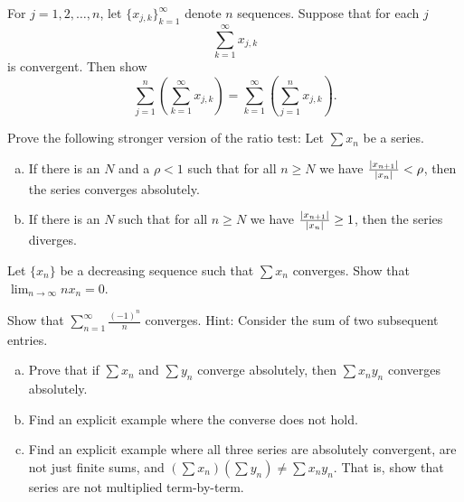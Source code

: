 \begin{exercise}
For $j=1,2,\ldots,n$, let $\{ x_{j,k} \}_{k=1}^\infty$ denote $n$
sequences.  Suppose that for each $j$
\begin{equation*}
\sum_{k=1}^\infty x_{j,k}
\end{equation*}
is convergent.  Then show
\begin{equation*}
\sum_{j=1}^n \left( \sum_{k=1}^\infty x_{j,k} \right)
=
\sum_{k=1}^\infty \left( \sum_{j=1}^n x_{j,k} \right) .
\end{equation*}
\end{exercise}

\begin{exercise}
Prove the following stronger version of the ratio test:
Let $\sum x_n$ be a series.
\begin{enumerate}[a)]
\item
If there is an $N$ and a $\rho < 1$ such that for
all $n \geq N$ we have
$\frac{\left\lvert {x_{n+1}} \right\rvert}{\left\lvert {x_n} \right\rvert} < \rho$, then
the series converges absolutely.
\item
If there is an $N$ such that for
all $n \geq N$ we have
$\frac{\left\lvert {x_{n+1}} \right\rvert}{\left\lvert {x_n} \right\rvert} \geq 1$, then
the series diverges. 
\end{enumerate}
\end{exercise}

\begin{exercise}[Challenging]
Let $\{ x_n \}$ be a decreasing sequence such that $\sum x_n$ converges.  Show
that $\displaystyle \lim_{n\to\infty} n x_n = 0$.
\end{exercise}

\begin{exercise}
Show that $\displaystyle \sum_{n=1}^\infty \frac{{(-1)}^n}{n}$ converges.
Hint: Consider the sum of two subsequent entries.
\end{exercise}

\begin{exercise}
\leavevmode
\begin{enumerate}[a)]
\item Prove that if $\sum x_n$ and $\sum y_n$ converge absolutely, then
$\sum x_ny_n$ converges absolutely.
\item Find an explicit example where the converse does not hold.
\item Find an explicit example where all three series are absolutely convergent,
are not just finite sums,
and $(\sum x_n)(\sum y_n) \not= \sum x_ny_n$.  That is, show that series are
not multiplied term-by-term.
\end{enumerate}
\end{exercise}

